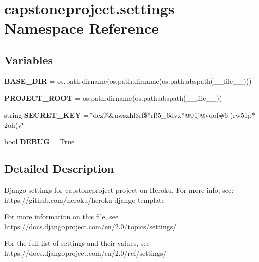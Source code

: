 \hypertarget{namespacecapstoneproject_1_1settings}{}\section{capstoneproject.\+settings Namespace Reference}
\label{namespacecapstoneproject_1_1settings}
\subsection*{Variables}
\begin{DoxyCompactItemize}
\item 
\mbox{\label{namespacecapstoneproject_1_1settings_a0abdf9b09cdabdff67fe76af50185639}} 
{\bfseries B\+A\+S\+E\+\_\+\+D\+IR} = os.\+path.\+dirname(os.\+path.\+dirname(os.\+path.\+abspath(\+\_\+\+\_\+file\+\_\+\+\_\+)))
\item 
\mbox{\label{namespacecapstoneproject_1_1settings_ae1cb294064c80b173aa526a55ee8fc66}} 
{\bfseries P\+R\+O\+J\+E\+C\+T\+\_\+\+R\+O\+OT} = os.\+path.\+dirname(os.\+path.\+abspath(\+\_\+\+\_\+file\+\_\+\+\_\+))
\item 
\mbox{\label{namespacecapstoneproject_1_1settings_a9ad1b5d2e6e08279f8d177ab57eb6ab2}} 
string {\bfseries S\+E\+C\+R\+E\+T\+\_\+\+K\+EY} = \char`\"{}dcz\%\&uwszhl\$rf\$$\ast$rf!5\+\_\+6dvx$\ast$@01j@vdof\#6-\/)rw51p$\ast$2oh(v\char`\"{}
\item 
\mbox{\label{namespacecapstoneproject_1_1settings_a9943e0f23d56f83a87df3fa7dd910e58}} 
bool {\bfseries D\+E\+B\+UG} = True
\end{DoxyCompactItemize}


\subsection{Detailed Description}
\begin{DoxyVerb}Django settings for capstoneproject project on Heroku. For more info, see:
https://github.com/heroku/heroku-django-template

For more information on this file, see
https://docs.djangoproject.com/en/2.0/topics/settings/

For the full list of settings and their values, see
https://docs.djangoproject.com/en/2.0/ref/settings/
\end{DoxyVerb}
 
